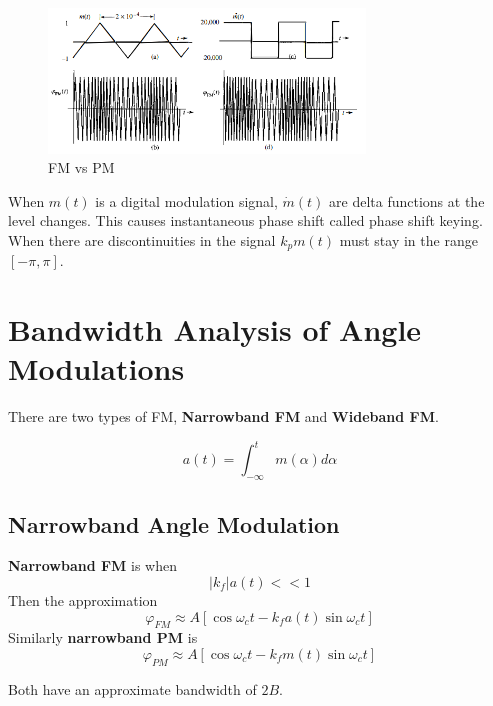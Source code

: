 \documentclass{article}
\begin{document}
    \begin{figure}[h]
        \centering
        \includegraphics[width=0.75\textwidth]{fm_pm}
        \caption{FM vs PM}
    \end{figure}

    When $m(t)$ is a digital modulation signal, $\dot{m}(t)$ are delta functions at the level changes. This causes instantaneous phase shift called
    phase shift keying. When there are discontinuities in the signal $k_pm(t)$ must stay in the range $[-\pi, \pi]$. 

    \section{Bandwidth Analysis of Angle Modulations}
    There are two types of FM, \textbf{Narrowband FM} and \textbf{Wideband FM}. 

    \begin{equation}
        a(t) = \int_{-\infty}^{t}m(\alpha)d\alpha
    \end{equation}

    \subsection{Narrowband Angle Modulation}
    \textbf{Narrowband FM} is when 
    \begin{equation}
        |k_f|a(t) << 1
    \end{equation}
    Then the approximation 
    \begin{equation}
        \varphi_{FM} \approx A[\cos\omega_ct-k_fa(t)\sin\omega_ct]
    \end{equation}
    Similarly \textbf{narrowband PM} is 
    \begin{equation}
        \varphi_{PM} \approx A[\cos\omega_ct-k_fm(t)\sin\omega_ct]
    \end{equation}
    
    Both have an approximate bandwidth of $2B$.
\end{document}
